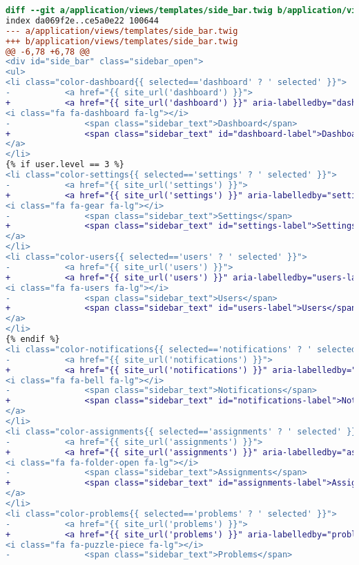 \begin{itemize}
\begin{lstlisting}[language=diff, caption=Perubahan untuk mematuhi kriteria 2.4.4, label=lst_2.4.4, basicstyle=\ttfamily, frame=single,
columns=fullflexible, keepspaces=true, breaklines=true]
diff --git a/application/views/templates/side_bar.twig b/application/views/templates/side_bar.twig
index da069f2e..ce5a0e22 100644
--- a/application/views/templates/side_bar.twig
+++ b/application/views/templates/side_bar.twig
@@ -6,78 +6,78 @@
<div id="side_bar" class="sidebar_open">
<ul>
<li class="color-dashboard{{ selected=='dashboard' ? ' selected' }}">
- 			<a href="{{ site_url('dashboard') }}">
+ 			<a href="{{ site_url('dashboard') }}" aria-labelledby="dashboard-label">
<i class="fa fa-dashboard fa-lg"></i>
- 				<span class="sidebar_text">Dashboard</span>
+ 				<span class="sidebar_text" id="dashboard-label">Dashboard</span>
</a>
</li>
{% if user.level == 3 %}
<li class="color-settings{{ selected=='settings' ? ' selected' }}">
- 			<a href="{{ site_url('settings') }}">
+ 			<a href="{{ site_url('settings') }}" aria-labelledby="settings-label">
<i class="fa fa-gear fa-lg"></i>
- 				<span class="sidebar_text">Settings</span>
+ 				<span class="sidebar_text" id="settings-label">Settings</span>
</a>
</li>
<li class="color-users{{ selected=='users' ? ' selected' }}">
- 			<a href="{{ site_url('users') }}">
+ 			<a href="{{ site_url('users') }}" aria-labelledby="users-label">
<i class="fa fa-users fa-lg"></i>
- 				<span class="sidebar_text">Users</span>
+ 				<span class="sidebar_text" id="users-label">Users</span>
</a>
</li>
{% endif %}
<li class="color-notifications{{ selected=='notifications' ? ' selected' }}">
- 			<a href="{{ site_url('notifications') }}">
+ 			<a href="{{ site_url('notifications') }}" aria-labelledby="notifications-label">
<i class="fa fa-bell fa-lg"></i>
- 				<span class="sidebar_text">Notifications</span>
+ 				<span class="sidebar_text" id="notifications-label">Notifications</span>
</a>
</li>
<li class="color-assignments{{ selected=='assignments' ? ' selected' }}">
- 			<a href="{{ site_url('assignments') }}">
+ 			<a href="{{ site_url('assignments') }}" aria-labelledby="assignments-label">
<i class="fa fa-folder-open fa-lg"></i>
- 				<span class="sidebar_text">Assignments</span>
+ 				<span class="sidebar_text" id="assignments-label">Assignments</span>
</a>
</li>
<li class="color-problems{{ selected=='problems' ? ' selected' }}">
- 			<a href="{{ site_url('problems') }}">
+ 			<a href="{{ site_url('problems') }}" aria-labelledby="problems-label">
<i class="fa fa-puzzle-piece fa-lg"></i>
- 				<span class="sidebar_text">Problems</span>

\end{lstlisting}
\end{itemize}
